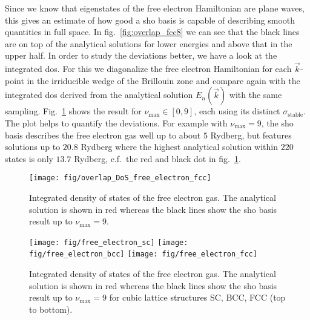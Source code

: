 \documentclass[oribibl]{llncs}
\newcommand{\um}[1]{_{\mathrm{#1}}}
\begin{document}
%
%
Since we know that eigenstates of the free electron Hamiltonian are plane waves,
this gives an estimate of how good a \ac{sho} basis is capable of describing
smooth quantities in full space. 
In fig.~\ref{fig:overlap_fcc8} we can see that the black lines are on top of the 
analytical solutions for lower energies and above that in the upper half.
In order to study the deviations better,
we have a look at the integrated \ac{dos}.
For this we diagonalize the free electron Hamiltonian for each $\vec k$-point
in the irriducible wedge of the Brillouin zone
and compare again with the integrated \ac{dos} derived from the analytical solution $E_n(\vec k)$
with the same sampling.
Fig.~\ref{fig:overlap_DoS_free_electron_fcc} shows the result for $\nu\um{max} \in [0, 9]$,
each using its distinct $\sigma\um{stable}$.
The plot helps to quantify the deviations. For example with $\nu\um{max} = 9$, the \ac{sho}
basis describes the free electron gas well up to about $5$ Rydberg, 
but features solutions up to $20.8$ Rydberg where the highest analytical solution
within $220$ states is only $13.7$ Rydberg,
c.f.~the red and black dot in fig.~\ref{fig:overlap_DoS_free_electron_fcc}.
%
\begin{figure}
  \begin{minipage}[c]{.990\textwidth}
	\texttt{[image: fig/overlap\_DoS\_free\_electron\_fcc]} %
  \end{minipage}\hfill
  \begin{minipage}[c]{.009\textwidth}
  \end{minipage}
  \label{fig:overlap_DoS_free_electron_fcc}
  \caption{
	Integrated density of states of the free electron gas. The analytical solution is shown in red
	whereas the black lines show the \ac{sho} basis result up to $\nu\um{max} = 9$.
  }
\end{figure}
%
%
\begin{figure}
  \begin{minipage}[c]{.990\textwidth}
	\texttt{[image: fig/free\_electron\_sc]} %
	\texttt{[image: fig/free\_electron\_bcc]} %
	\texttt{[image: fig/free\_electron\_fcc]} %
  \end{minipage}\hfill
  \begin{minipage}[c]{.009\textwidth}
  \end{minipage}
  \label{fig:overlap_DoS_free_electron_cubic_lattices}
  \caption{
	Integrated density of states of the free electron gas. The analytical solution is shown in red
	whereas the black lines show the \ac{sho} basis result up to $\nu\um{max} = 9$ 
	for cubic lattice structures SC, BCC, FCC (top to bottom).
  }
\end{figure}
%
%
\end{document}
